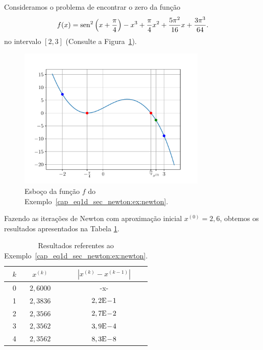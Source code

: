 \begin{ex}\label{cap_eq1d_sec_newton:ex:newton}
  Consideramos o problema de encontrar o zero da função
  \begin{equation}
    f(x) = \operatorname{sen}^2\left(x+\frac{\pi}{4}\right) - x^3 + \frac{\pi}{4}x^2 + \frac{5\pi^2}{16}x + \frac{3\pi^3}{64}.
  \end{equation}
  no intervalo $[2,3]$ (Consulte a Figura~\ref{cap_eq1d_sec_newton:fig:newton_ex}).

  \begin{figure}[H]
    \centering
    \includegraphics[width=0.8\textwidth]{./cap_eq1d/dados/fig_newton_ex/fig}
    \caption{Esboço da função $f$ do Exemplo~\ref{cap_eq1d_sec_newton:ex:newton}.}
  \label{cap_eq1d_sec_newton:fig:newton_ex}
\end{figure}


  Fazendo as iterações de Newton com aproximação inicial $x^{(0)}=2,6$, obtemos os resultados apresentados na Tabela \ref{tab:ex_Newton_exec}.

  \begin{table}[h!]
    \centering
    \caption{Resultados referentes ao Exemplo~\ref{cap_eq1d_sec_newton:ex:newton}.}
    \label{tab:ex_Newton_exec}
    \begin{tabular}{r|cc}
      $k$ & $x^{(k)}$ & $|x^{(k)}-x^{(k-1)}|$ \\\hline
      0 & $2,6000$ & -x-\\
      1 & $2,3836$ & $2,2\mathrm{E}\!-\!1$ \\
      2 & $2,3566$ & $2,7\mathrm{E}\!-\!2$ \\
      3 & $2,3562$ & $3,9\mathrm{E}\!-\!4$ \\
      4 & $2,3562$ & $8,3\mathrm{E}\!-\!8$ \\\hline
    \end{tabular}
  \end{table}


\end{ex}
